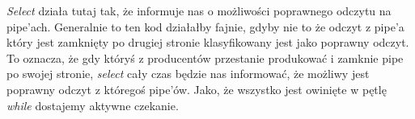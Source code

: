 \textit{Select} działa tutaj tak, że informuje nas o możliwości poprawnego odczytu na pipe'ach. Generalnie to ten kod działałby fajnie, gdyby nie to że odczyt z pipe'a który jest zamknięty po drugiej stronie klasyfikowany jest jako poprawny odczyt. To oznacza, że gdy któryś z producentów przestanie produkować i zamknie pipe po swojej stronie, \textit{select} cały czas będzie nas informować, że możliwy jest poprawny odczyt z któregoś pipe'ów. Jako, że wszystko jest owinięte w pętlę \textit{while} dostajemy aktywne czekanie.
